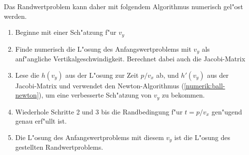 Das Randwertproblem kann daher mit folgendem Algorithmus numerisch gel"ost
werden.
\begin{enumerate}
\item Beginne mit einer Sch"atzung f"ur $v_y$
\item Finde numerisch die L"osung des Anfangswertproblems mit $v_y$
als anf"angliche Vertikalgeschwindigkeit.
Berechnet dabei auch die Jacobi-Matrix
\item Lese die $h(v_y)$ aus der L"osung zur Zeit $p/v_x$ ab, und $h'(v_y)$
aus der Jacobi-Matrix und verwendet den Newton-Algorithmus
(\ref{numerik:ball-newton}), um eine verbesserte Sch"atzung von $v_y$ 
zu bekommen.
\item Wiederhole Schritte 2 und 3 bis die Randbedingung f"ur $t=p/v_x$
gen"ugend genau erf"ullt ist.
\item Die L"osung des Anfangswertproblems mit diesem $v_y$ ist die
L"osung des gestellten Randwertproblems.
\end{enumerate}

